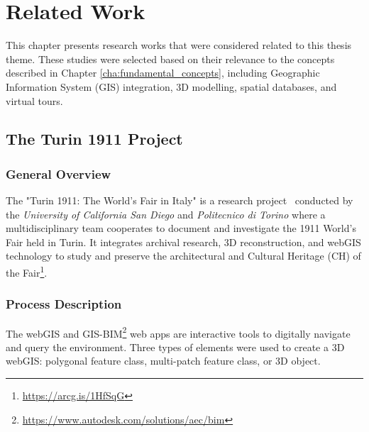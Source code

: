 
%


\chapter{Related Work}
\label{cha:related_work}

This chapter presents research works that were considered related to this thesis theme.
These studies were selected based on their relevance to the concepts described in Chapter \ref{cha:fundamental_concepts}, including Geographic Information System (\gls{GIS}) integration, \gls{3D} modelling, spatial databases, and virtual tours.

\section{The Turin 1911 Project}
\label{sec:turin_project} 

\subsection*{General Overview}

The "Turin 1911: The World's Fair in Italy" is a research project~\cite{article} conducted by the \textit{University of California San Diego} and  \textit{Politecnico di Torino} where a multidisciplinary team cooperates to document and investigate the 1911 World’s Fair held in Turin.
It integrates archival research, \gls{3D} reconstruction, and web\gls{GIS} technology to study and preserve the architectural and Cultural Heritage (\gls{CH}) of the Fair\footnote{\url{https://arcg.is/1HfSqG}}.

\subsection*{Process Description}

The web\gls{GIS} and \gls{GIS}-\gls{BIM}\footnote{\url{https://www.autodesk.com/solutions/aec/bim}} web apps are interactive tools to digitally navigate and query the environment. 
Three types of elements were used to create a \gls{3D} web\gls{GIS}: polygonal feature class, multi-patch feature class, or \gls{3D} object.

